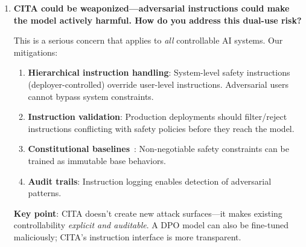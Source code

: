 \begin{enumerate}[label=\textbf{Q\arabic*.}, leftmargin=*, itemsep=8pt]
 The overhead is minimal for modern LLMs:

\begin{itemize}[leftmargin=*,itemsep=2pt]
    \item \textbf{Context impact}: 10--40 tokens is $<$0.5\% of typical 8K--128K context windows
    \item \textbf{Latency impact}: Negligible for KV-cached inference
    \item \textbf{Cost impact}: $<$\$0.0001 per request at current API pricing
\end{itemize}

\textbf{Benefit outweighs cost}: One CITA model replaces N separate DPO models for N deployment contexts. The instruction overhead is far cheaper than maintaining model variants.

\textbf{System prompt precedent}: Production LLMs (GPT-4, Claude) already use 100--500 token system prompts. CITA's instruction overhead is smaller.

\vspace{4mm}

\item \textbf{CITA could be weaponized---adversarial instructions could make the model actively harmful. How do you address this dual-use risk?}

 This is a serious concern that applies to \textit{all} controllable AI systems. Our mitigations:

\begin{enumerate}[leftmargin=*,itemsep=2pt]
    \item \textbf{Hierarchical instruction handling}: System-level safety instructions (deployer-controlled) override user-level instructions. Adversarial users cannot bypass system constraints.

    \item \textbf{Instruction validation}: Production deployments should filter/reject instructions conflicting with safety policies before they reach the model.

    \item \textbf{Constitutional baselines}~\cite{bai2022constitutional}: Non-negotiable safety constraints can be trained as immutable base behaviors.

    \item \textbf{Audit trails}: Instruction logging enables detection of adversarial patterns.
\end{enumerate}

\textbf{Key point}: CITA doesn't create new attack surfaces---it makes existing controllability \textit{explicit and auditable}. A DPO model can also be fine-tuned maliciously; CITA's instruction interface is more transparent.


\end{enumerate}

